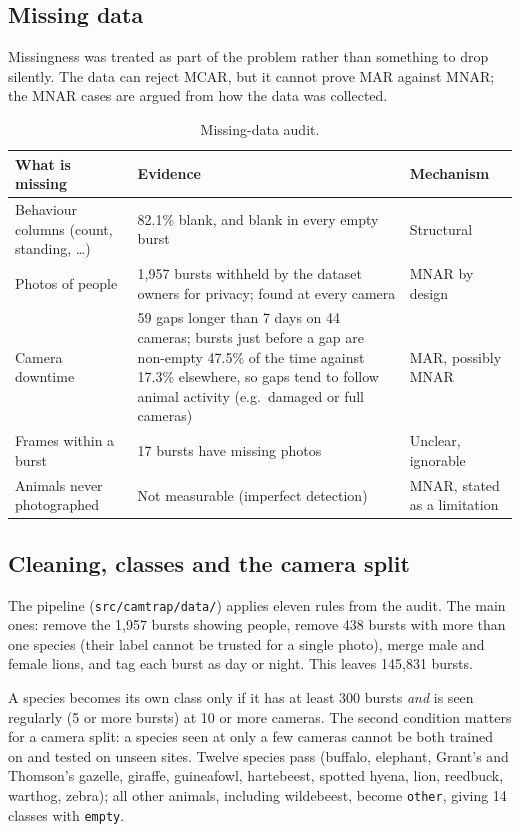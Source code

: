 \documentclass[11pt,a4paper]{article}
\begin{document}
\subsection{Missing data}
Missingness was treated as part of the problem rather than something to drop silently. The data can
reject MCAR, but it cannot prove MAR against MNAR; the MNAR cases are argued from how the data was
collected.

\begin{table}[H]
\centering\small
\begin{tabularx}{\textwidth}{p{3.6cm}Xp{2.4cm}}
\toprule
What is missing & Evidence & Mechanism \\
\midrule
Behaviour columns (count, standing, \ldots) & 82.1\% blank, and blank in every empty burst & Structural \\
Photos of people & 1,957 bursts withheld by the dataset owners for privacy; found at every camera & MNAR by design \\
Camera downtime & 59 gaps longer than 7 days on 44 cameras; bursts just before a gap are non-empty
47.5\% of the time against 17.3\% elsewhere, so gaps tend to follow animal activity (e.g.\ damaged or full cameras) & MAR, possibly MNAR \\
Frames within a burst & 17 bursts have missing photos & Unclear, ignorable \\
Animals never photographed & Not measurable (imperfect detection) & MNAR, stated as a limitation \\
\bottomrule
\end{tabularx}
\caption{Missing-data audit.}
\end{table}

\subsection{Cleaning, classes and the camera split}
The pipeline (\texttt{src/camtrap/data/}) applies eleven rules from the audit. The main ones: remove the
1,957 bursts showing people, remove 438 bursts with more than one species (their label cannot be
trusted for a single photo), merge male and female lions, and tag each burst as day or night. This leaves
145,831 bursts.

A species becomes its own class only if it has at least 300 bursts \emph{and} is seen regularly (5 or more
bursts) at 10 or more cameras. The second condition matters for a camera split: a species seen at only a
few cameras cannot be both trained on and tested on unseen sites. Twelve species pass (buffalo,
elephant, Grant's and Thomson's gazelle, giraffe, guineafowl, hartebeest, spotted hyena, lion, reedbuck,
warthog, zebra); all other animals, including wildebeest, become \texttt{other}, giving 14 classes with
\texttt{empty}.
\end{document}

